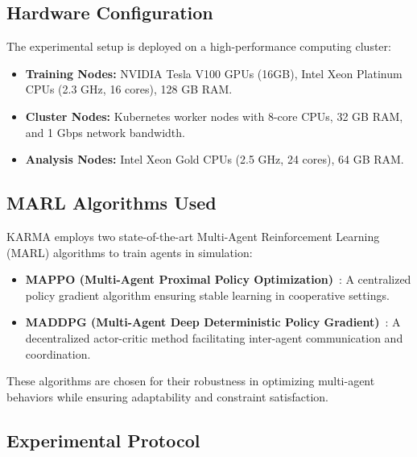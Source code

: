 \documentclass[conference]{IEEEtran}
\begin{document}
\subsection{Hardware Configuration}

The experimental setup is deployed on a high-performance computing cluster:
\begin{itemize}
    \item \textbf{Training Nodes:} NVIDIA Tesla V100 GPUs (16GB), Intel Xeon Platinum CPUs (2.3 GHz, 16 cores), 128 GB RAM.
    \item \textbf{Cluster Nodes:} Kubernetes worker nodes with 8-core CPUs, 32 GB RAM, and 1 Gbps network bandwidth.
    \item \textbf{Analysis Nodes:} Intel Xeon Gold CPUs (2.5 GHz, 24 cores), 64 GB RAM.
\end{itemize}

\subsection{MARL Algorithms Used}

KARMA employs two state-of-the-art Multi-Agent Reinforcement Learning (MARL) algorithms to train agents in simulation:
\begin{itemize}
    \item \textbf{MAPPO (Multi-Agent Proximal Policy Optimization)}~\cite{yu2021mappo}: A centralized policy gradient algorithm ensuring stable learning in cooperative settings.
    \item \textbf{MADDPG (Multi-Agent Deep Deterministic Policy Gradient)}~\cite{lowe2017multi}: A decentralized actor-critic method facilitating inter-agent communication and coordination.
\end{itemize}

These algorithms are chosen for their robustness in optimizing multi-agent behaviors while ensuring adaptability and constraint satisfaction.

\subsection{Experimental Protocol}
\end{document}
